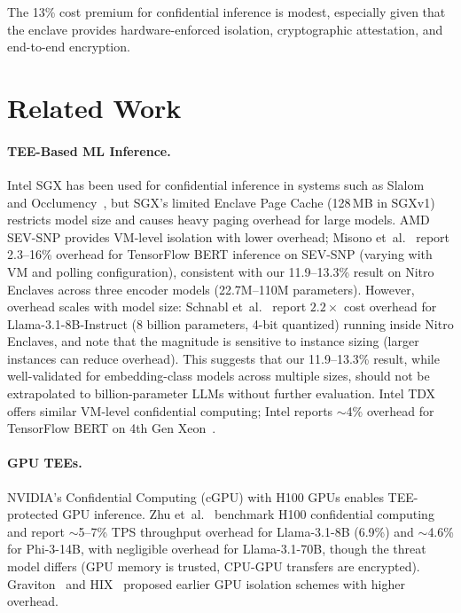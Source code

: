 \documentclass[11pt,a4paper]{article}
\newcommand{\BenchOverheadRange}{11.9--13.3\%}
\begin{document}
The 13\% cost premium for confidential inference is modest, especially given that the enclave provides hardware-enforced isolation, cryptographic attestation, and end-to-end encryption.

\section{Related Work}
\label{sec:related-work}

\paragraph{TEE-Based ML Inference.}
Intel SGX has been used for confidential inference in systems such as Slalom~\cite{tramer2019} and Occlumency~\cite{lee2019}, but SGX's limited Enclave Page Cache (128\,MB in SGXv1) restricts model size and causes heavy paging overhead for large models.
AMD SEV-SNP provides VM-level isolation with lower overhead; Misono et~al.~\cite{misono2024} report 2.3--16\% overhead for TensorFlow BERT inference on SEV-SNP (varying with VM and polling configuration), consistent with our \BenchOverheadRange{} result on Nitro Enclaves across three encoder models (22.7M--110M parameters).
However, overhead scales with model size: Schnabl et~al.~\cite{schnabl2025} report $2.2\times$ cost overhead for Llama-3.1-8B-Instruct (8 billion parameters, 4-bit quantized) running inside Nitro Enclaves, and note that the magnitude is sensitive to instance sizing (larger instances can reduce overhead).
This suggests that our \BenchOverheadRange{} result, while well-validated for embedding-class models across multiple sizes, should not be extrapolated to billion-parameter LLMs without further evaluation.
Intel TDX offers similar VM-level confidential computing; Intel reports $\sim$4\% overhead for TensorFlow BERT on 4th Gen Xeon~\cite{intel2023}.

\paragraph{GPU TEEs.}
NVIDIA's Confidential Computing (cGPU) with H100 GPUs enables TEE-protected GPU inference.
Zhu et~al.~\cite{zhu2024} benchmark H100 confidential computing and report $\sim$5--7\% TPS throughput overhead for Llama-3.1-8B (6.9\%) and $\sim$4.6\% for Phi-3-14B, with negligible overhead for Llama-3.1-70B, though the threat model differs (GPU memory is trusted, CPU-GPU transfers are encrypted).
Graviton~\cite{volos2018} and HIX~\cite{jang2019} proposed earlier GPU isolation schemes with higher overhead.
\end{document}
